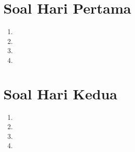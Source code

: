 \section{Soal Hari Pertama}
\begin{enumerate}
    \item 
    \item 
    \item 
    \item 
\end{enumerate}
\newpage
\section{Soal Hari Kedua}
\begin{enumerate}[resume]
    \item 
    \item 
    \item 
    \item 
\end{enumerate}